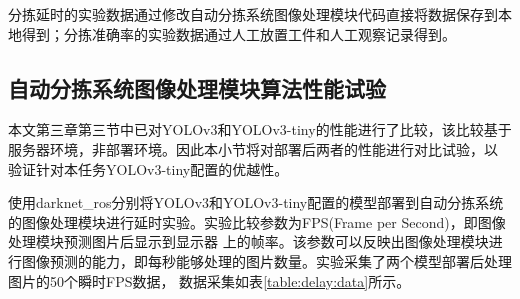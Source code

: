 分拣延时的实验数据通过修改自动分拣系统图像处理模块代码直接将数据保存到本地得到；分拣准确率的实验数据通过人工放置工件和人工观察记录得到。


\subsection{自动分拣系统图像处理模块算法性能试验}

本文第三章第三节中已对YOLOv3和YOLOv3-tiny的性能进行了比较，该比较基于服务器环境，非部署环境。因此本小节将对部署后两者的性能进行对比试验，以
验证针对本任务YOLOv3-tiny配置的优越性。

使用darknet\_ros分别将YOLOv3和YOLOv3-tiny配置的模型部署到自动分拣系统的图像处理模块进行延时实验。实验比较参数为FPS(Frame per Second)，即图像处理模块预测图片后显示到显示器
上的帧率。该参数可以反映出图像处理模块进行图像预测的能力，即每秒能够处理的图片数量。实验采集了两个模型部署后处理图片的50个瞬时FPS数据，
数据采集如表\ref{table:delay:data}所示。

